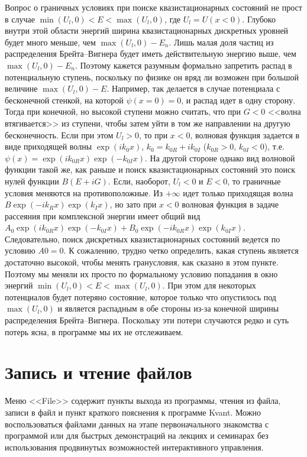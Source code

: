 \documentclass[12pt]{article}
\begin{document}
Вопрос о граничных условиях при поиске квазистационарных состояний не прост  в случае %
$\min(U_l,0)<E<\max(U_l,0)$, где $U_l=U(x<0)$. Глубоко внутри этой области энергий ширина квазистационарных дискретных
уровней будет много меньше, чем $\max(U_l,0)-E_n$. Лишь малая доля частиц из распределения Брейта--Вигнера
будет иметь действительную энергию выше, чем $\max(U_l,0)-E_n$. Поэтому кажется разумным формально запретить
распад в  потенциальную ступень, поскольку по физике он вряд ли возможен при большой величине $\max(U_l,0)-E$.
Например, так делается в случае потенциала с бесконечной стенкой, на которой $\psi(x=0)=0$, и распад идет в
одну сторону. Тогда при конечной, но высокой ступени можно считать, что при $G<0$ <<волна втягивается>> из ступени,
чтобы  затем уйти в том же направлении на другую бесконечность. Если при этом $U_l>0$, то при $x<0$,
волновая функция задается в виде приходящей волны $\exp(ik_0x)$, $k_0=k_{0R}+ik_{0I}$ ($k_{0R}>0$, $k_{0I}<0$),
т.е. $\psi(x)=\exp(ik_{0R}x)\exp(-k_{0I}x)$. На другой стороне однако вид волновой функции такой же, как раньше
и поиск квазистационарных состояний это поиск нулей функции $B(E+iG)$. Если, наоборот, $U_l<0$ и $E<0$, то
граничные условия меняются на противоположные. Из $+\infty$ %
идет только приходящая волна $B\exp(-ik_Rx)\exp(k_Ix)$,
 но зато при $x<0$ волновая функция в задаче рассеяния при комплексной энергии имеет общий вид
$A_0\exp(ik_{0R}x)\exp(-k_{0I}x)+B_0\exp(-ik_{0R}x)\exp(k_{0I}x)$. Следовательно, поиск дискретных
квазистационарных состояний ведется по условию $A0=0$. К сожалению, трудно четко определить, какая ступень
является достаточно высокой, чтобы менять гранусловия, как сказано в этом пункте. Поэтому мы меняли их
просто по формальному условию попадания в окно энергий $\min(U_l,0)<E<\max(U_l,0)$.
При этом для некоторых потенциалов будет потеряно состояние, которое только что опустилось под $\max(U_l,0)$
и является распадным в обе стороны из-за конечной ширины распределения Брейта--Вигнера.
Поскольку эти потери случаются редко и суть потерь ясна, в программе мы их не отслеживаем.

\hypertarget{File}{}\section{Запись и чтение файлов}
Меню <<File>> содержит пункты  выхода из программы, чтения из файла, записи в файл
и пункт краткого пояснения к программе Kvant.
Можно воспользоваться файлами данных на этапе первоначального знакомства с программой или
для быстрых демонстраций на лекциях и семинарах без использования продвинутых возможностей
интерактивного управления.
\end{document}
